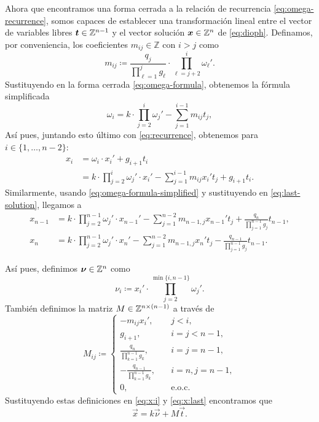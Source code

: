 Ahora que encontramos una forma cerrada a la relación de recurrencia \eqref{eq:omega-recurrence},
somos capaces de establecer una transformación lineal entre el vector de variables libres $\boldsymbol{t}
\in \mathbb{Z}^{n-1}$ y el vector solución $\boldsymbol{x} \in \mathbb{Z}^{n}$ de \eqref{eq:dioph}. Definamos, por
conveniencia, los coeficientes $m_{ij} \in \mathbb{Z}$ con $i > j$ como
\begin{equation}
	\label{phase-2:eq:coeffs}
	m_{ij} \coloneq \frac{q_j}{\prod_{\ell = 1}^{j}g_\ell} \cdot \prod_{\ell = j +
	2}^{i}\omega_\ell'.
\end{equation}
Sustituyendo en la forma cerrada \eqref{eq:omega-formula}, obtenemos la fórmula simplificada
\begin{equation}
	\label{eq:omega-formula-simplified}
	\omega_i =
	k \cdot \prod_{j=2}^{i} \omega_j'
	- \sum_{j=1}^{i - 1}m_{ij}t_j,
\end{equation}
Así pues, juntando esto último con \eqref{eq:recurrence}, obtenemos para $i \in \{1, \ldots, n -
2\}$: 
\begin{align}
	x_i &= \omega_i \cdot x_i' + g_{i + 1}t_i \nonumber \\
		&= k \cdot \prod_{j=2}^{i}\omega_j' \cdot x_i' - \sum_{j=1}^{i - 1}m_{ij}x_i'
		t_j + g_{i + 1}t_i \label{eq:x:i}.
\end{align}
Similarmente, usando \eqref{eq:omega-formula-simplified} y sustituyendo en \eqref{eq:last-solution},
llegamos a
\begin{subequations}
	\label{eq:x:last}
	\begin{align}
		x_{n-1} &= k \cdot \prod_{j=2}^{n-1} \omega_j' \cdot x_{n-1}' - \sum_{j=1}^{n-2}
		m_{n-1,j}x_{n-1}' t_j + \frac{q_n}{\prod_{j=1}^{n-1}g_j} t_{n-1}, \\
		x_{n} &= k \cdot \prod_{j=2}^{n-1} \omega_j' \cdot x_{n}' - \sum_{j=1}^{n-2}
		m_{n-1,j}x_{n}' t_j - \frac{q_{n - 1}}{\prod_{j=1}^{n-1}g_j} t_{n-1}.
	\end{align}
\end{subequations}

Así pues, definimos $\boldsymbol{\nu} \in \mathbb{Z}^n$ como
\begin{equation}
	\label{eq:vec-omega}
	\nu_i \coloneq x_i' \cdot \prod_{j = 2}^{\min{\lbrace i, n - 1 \rbrace}}\omega_j'.
\end{equation}
También definimos la matriz $M \in \mathbb{Z}^{n \times (n - 1)}$ a través de
\begin{equation}
	\label{eq:mat-T}
	M_{ij} \coloneq \begin{cases}
		-m_{ij}x_i', &\quad j < i, \\
		g_{i + 1},  &\quad i = j < n - 1, \\
		\frac{q_n}{\prod_{k=1}^{n-1}g_k}, &\quad i = j = n - 1, \\
		-\frac{q_{n-1}}{\prod_{k=1}^{n-1}g_k}, &\quad i = n, j = n - 1, \\
		0, &\quad \text{e.o.c.}
	\end{cases}
\end{equation}
Sustituyendo estas definiciones en \eqref{eq:x:i} y \eqref{eq:x:last} encontramos que
\begin{equation}
	\label{eq:transf}
	\vec{x} = k\vec{\nu} + M\vec{t}.
\end{equation}

